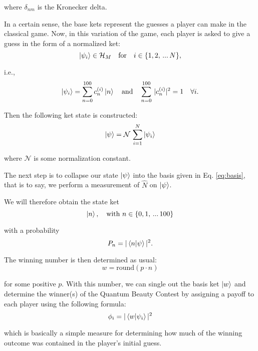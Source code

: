 where $\delta_{nm}$ is the Kronecker delta.

In a certain sense, the base kets represent the guesses a player can make in the classical game. Now, in this variation of the game, each player is asked to give a guess in the form of a normalized ket:
\begin{equation}
  \ket{\psi_i}\in\mathcal{H}_M \quad \text{for}\quad  i\in\{1,2,\,...\,N\},
\end{equation}

i.e.,
\begin{equation}
    \ket{\psi_i} = \sum_{n=0}^{100} c_n^{(i)} \ket{n}\quad \text{and}\quad \sum_{n=0}^{100} \, |c_n^{(i)}|^2 = 1\quad \forall i.
\end{equation}

Then the following ket state is constructed:
\begin{equation}
\label{eq:game_ket}
  \ket{\psi}=\mathcal{N}\,\sum_{i=1}^{N}\ket{\psi_i}
\end{equation}

where $\mathcal{N}$ is some normalization constant.

The next step is to collapse our state $\ket{\psi}$ into the basis given in Eq. \ref{eq:basis}, that is to say, we perform a measurement of $\hat{N}$ on $\ket{\psi}$.

We will therefore obtain the state ket
\begin{equation}
  \ket{n},\quad \text{with }n\in\{0,1,\,...\,100\}
\end{equation}

with a probability
\begin{equation}
  P_n=|\braket{n|\psi}|^2.
\end{equation}

The winning number is then determined as usual:
\begin{equation}
  w=\text{round}(p\cdot n)
\end{equation}

for some positive $p$. With this number, we can single out the basis ket $\ket{w}$ and determine the winner(s) of the Quantum Beauty Contest by assigning a payoff to each player using the following formula:
\begin{equation}
  \phi_i=|\braket{w|\psi_i}|^2
\end{equation}

which is basically a simple measure for determining how much of the winning outcome was contained in the player's initial guess.

